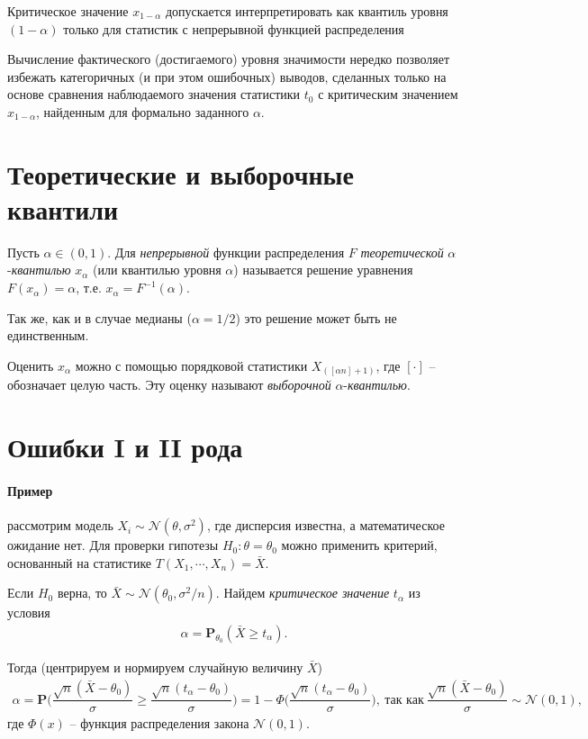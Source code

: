\documentclass[%
	11pt,
	a4paper,
	utf8,
		]{article}
\begin{document}
{\color{red} Критическое значение $ x_{1 - \alpha} $ допускается интерпретировать как квантиль уровня $ (1 - \alpha) $ только для статистик с непрерывной функцией распределения}

Вычисление фактического (достигаемого) уровня значимости нередко позволяет избежать категоричных (и при этом ошибочных) выводов, сделанных только на основе сравнения наблюдаемого значения статистики $ t_0 $ с критическим значением $ x_{1 - \alpha} $, найденным для формально заданного $ \alpha $.


\section{Теоретические и выборочные квантили}

Пусть $ \alpha \in (0, 1) $. Для \emph{непрерывной} функции распределения $ F $ \emph{теоретической} $ \alpha $-\emph{квантилью} $ x_\alpha $ (или квантилью уровня $ \alpha $) называется решение уравнения $ F(x_\alpha) = \alpha $, т.е. $ x_\alpha = F^{-1}(\alpha) $.

Так же, как и в случае медианы ($ \alpha = 1/2 $) это решение может быть не единственным.

Оценить $ x_\alpha $ можно с помощью порядковой статистики $ X_{([\alpha n] + 1)} $, где $ [\cdot] $ -- обозначает целую часть. Эту оценку называют \emph{выборочной} $ \alpha $-\emph{квантилью}.

\section{Ошибки I и II рода}

\paragraph{Пример} рассмотрим модель $ X_i \sim \mathcal{N}(\theta, \sigma^2) $, где дисперсия известна, а математическое ожидание нет. Для проверки гипотезы $ H_0: \theta = \theta_0 $ можно применить критерий, основанный на статистике $ T(X_1, \cdots, X_n) = \bar{X} $.

Если $ H_0 $ верна, то $ \bar{X} \sim \mathcal{N}(\theta_0, \sigma^2/n) $. Найдем \emph{критическое значение} $ t_\alpha $ из условия
\begin{align*}
	\alpha = \mathbf{P}_{\theta_0} (\bar{X} \geqslant t_\alpha).
\end{align*}

Тогда (центрируем и нормируем случайную величину $ \bar{X} $)
\begin{align*}
	\alpha = \mathbf{P} \Bigg( \dfrac{\sqrt{n} (\bar{X} - \theta_0)}{\sigma} \geqslant \dfrac{\sqrt{n} (t_\alpha - \theta_0)}{\sigma} \Bigg) = 1 - \Phi\Bigg(\dfrac{\sqrt{n} (t_\alpha - \theta_0)}{\sigma}\Bigg), \ \text{так как} \ \dfrac{\sqrt{n} (\bar{X} - \theta_0)}{\sigma} \sim \mathcal{N}(0, 1),
\end{align*}
где $ \Phi(x) $ -- функция распределения закона $ \mathcal{N}(0, 1) $.
\end{document}
